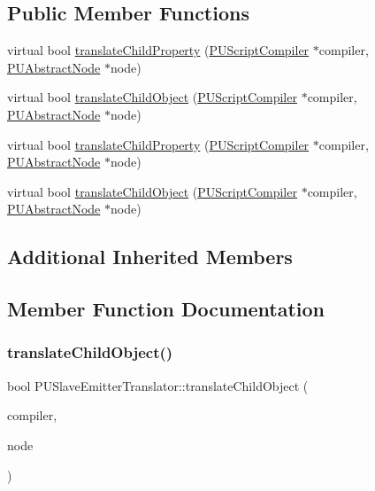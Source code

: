 \subsection*{Public Member Functions}
\begin{DoxyCompactItemize}
\item 
virtual bool \hyperlink{classPUSlaveEmitterTranslator_ab4792b47518f7993d5da8af87a00d80d}{translate\+Child\+Property} (\hyperlink{classPUScriptCompiler}{P\+U\+Script\+Compiler} $\ast$compiler, \hyperlink{classPUAbstractNode}{P\+U\+Abstract\+Node} $\ast$node)
\item 
virtual bool \hyperlink{classPUSlaveEmitterTranslator_a35148e4f354a0a21ad92a87a57afa8a0}{translate\+Child\+Object} (\hyperlink{classPUScriptCompiler}{P\+U\+Script\+Compiler} $\ast$compiler, \hyperlink{classPUAbstractNode}{P\+U\+Abstract\+Node} $\ast$node)
\item 
virtual bool \hyperlink{classPUSlaveEmitterTranslator_a19bfee38e48ef8ce0c300e99539e1761}{translate\+Child\+Property} (\hyperlink{classPUScriptCompiler}{P\+U\+Script\+Compiler} $\ast$compiler, \hyperlink{classPUAbstractNode}{P\+U\+Abstract\+Node} $\ast$node)
\item 
virtual bool \hyperlink{classPUSlaveEmitterTranslator_a18c86075146e345fd8d84d6bf4c830a7}{translate\+Child\+Object} (\hyperlink{classPUScriptCompiler}{P\+U\+Script\+Compiler} $\ast$compiler, \hyperlink{classPUAbstractNode}{P\+U\+Abstract\+Node} $\ast$node)
\end{DoxyCompactItemize}
\subsection*{Additional Inherited Members}


\subsection{Member Function Documentation}
\mbox{\label{classPUSlaveEmitterTranslator_a35148e4f354a0a21ad92a87a57afa8a0}} 
\subsubsection{\texorpdfstring{translate\+Child\+Object()}{translateChildObject()}\hspace{0.1cm}{\footnotesize\ttfamily [1/2]}}
{\footnotesize\ttfamily bool P\+U\+Slave\+Emitter\+Translator\+::translate\+Child\+Object (\begin{DoxyParamCaption}\item[{\hyperlink{classPUScriptCompiler}{P\+U\+Script\+Compiler} $\ast$}]{compiler,  }\item[{\hyperlink{classPUAbstractNode}{P\+U\+Abstract\+Node} $\ast$}]{node }\end{DoxyParamCaption})\hspace{0.3cm}{\ttfamily [virtual]}}


